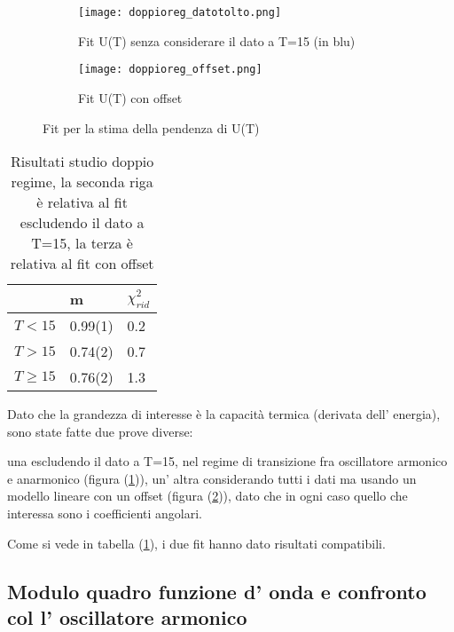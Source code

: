\documentclass{article}
\begin{document}
\begin{figure}[h]
     \centering
     \begin{subfigure}[b]{0.48\textwidth}
         \centering
         \texttt{[image: doppioreg\_datotolto.png]}
         \caption{Fit U(T) senza considerare il dato a T=15 (in blu)}
         \label{fig:doppioregnodato}
     \end{subfigure}
     \hfill
     \begin{subfigure}[b]{0.48\textwidth}
         \centering
         \texttt{[image: doppioreg\_offset.png]}
         \caption{Fit U(T) con offset}
         \label{fig:doppioregoffset}
     \end{subfigure}
     \hfill
        \caption{Fit per la stima della pendenza di U(T)}
        \label{fig:csi12}
\end{figure}



\begin{table}[h]
\centering
\begin{tabular}{lll}
                  & m       & $\chi^2_{rid}$ \\ \hline\hline
$T<15$    & 0.99(1) & 0.2            \\
$T> 15$ & 0.74(2) & 0.7          \\
$T \geq 15$ & 0.76(2) & 1.3
\end{tabular}
\caption{Risultati studio doppio regime, la seconda riga è relativa al fit escludendo il dato a T=15, la terza è relativa al fit con offset}
\label{risdoppioreg}
\end{table}

Dato che la grandezza di interesse è la capacità termica (derivata dell' energia), sono state fatte due prove diverse:

una escludendo il dato a T=15, nel regime di transizione fra oscillatore armonico e anarmonico (figura (\ref{fig:doppioregnodato})), un' altra considerando tutti i dati ma usando un modello lineare con un offset (figura (\ref{fig:doppioregoffset})), dato che in ogni caso quello che interessa sono i coefficienti angolari.

Come si vede in tabella (\ref{risdoppioreg}), i due fit hanno dato risultati compatibili.

\newpage
\subsection{Modulo quadro funzione d' onda e confronto col l' oscillatore armonico}
\end{document}
